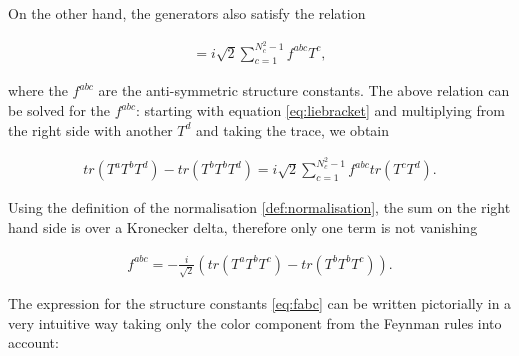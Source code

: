 \documentclass{article}
\theoremstyle{definition}
\numberwithin{equation}{section}
\begin{document}
On the other hand, the generators also satisfy the relation

\begin{align}
    [ T^a, T^b ] = i \sqrt{2} \sum_{c=1}^{N_c^2 - 1} f^{abc} T^c, \label{eq:liebracket}
\end{align}

where the $f^{abc}$ are the anti-symmetric structure constants. The above relation can be solved for the $f^{abc}$: starting with equation \eqref{eq:liebracket} and multiplying from the right side with another $T^d$ and taking the trace, we obtain

\begin{align}
    tr (T^a T^b T^d) - tr(T^b T^b T^d)  = i \sqrt{2} \sum_{c=1}^{N_c^2 - 1} f^{abc} tr (T^c T^d).
\end{align}

Using the definition of the normalisation \ref{def:normalisation}, the sum on the right hand side is over a Kronecker delta, therefore only one term is not vanishing

\begin{align}
    f^{abc} = -\frac{i}{\sqrt{2}} \left( tr (T^a T^b T^c) - tr(T^b T^b T^c) \right). \label{eq:fabc}
\end{align}

The expression for the structure constants \eqref{eq:fabc} can be written pictorially in a very intuitive way taking only the color component from the Feynman rules into account:
\end{document}
